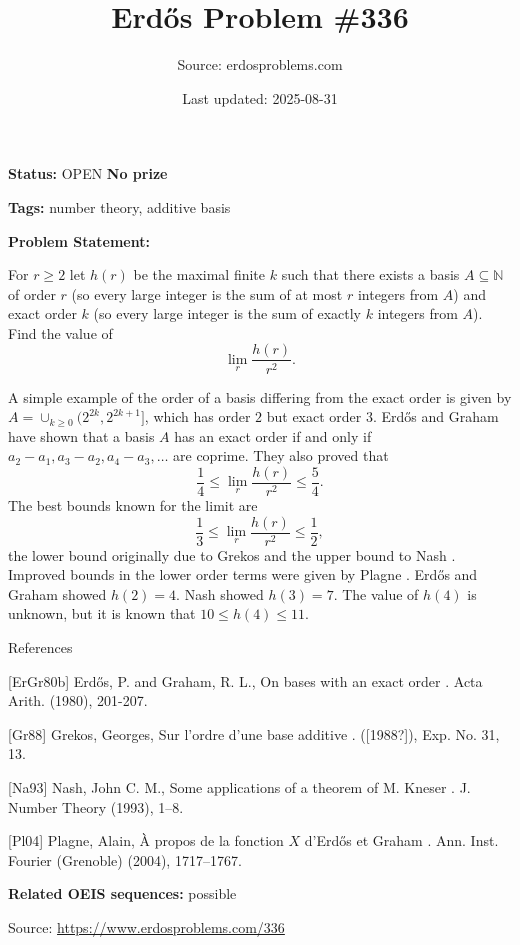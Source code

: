 \documentclass{article}
\title{Erd\H{o}s Problem \#336}
\date{Last updated: 2025-08-31}
\author{Source: erdosproblems.com}
\begin{document}
\maketitle

\noindent\textbf{Status:} OPEN \quad \textbf{No prize}

\noindent\textbf{Tags:} number theory, additive basis

\medskip

\noindent\textbf{Problem Statement:}

For $r\geq 2$ let $h(r)$ be the maximal finite $k$ such that there exists a basis $A\subseteq \mathbb{N}$ of order $r$ (so every large integer is the sum of at most $r$ integers from $A$) and exact order $k$ (so every large integer is the sum of exactly $k$ integers from $A$). Find the value of\[\lim_r \frac{h(r)}{r^2}.\]




A simple example of the order of a basis differing from the exact order is given by $A=\cup_{k\geq 0}(2^{2k},2^{2k+1}]$, which has order $2$ but exact order $3$. Erd\H{o}s and Graham \cite{ErGr80b} have shown that a basis $A$ has an exact order if and only if $a_2-a_1,a_3-a_2,a_4-a_3,\ldots$ are coprime. They also proved that\[\frac{1}{4}\leq \lim_r \frac{h(r)}{r^2}\leq \frac{5}{4}.\]The best bounds known for the limit are\[\frac{1}{3}\leq \lim_r \frac{h(r)}{r^2}\leq \frac{1}{2},\]the lower bound originally due to Grekos \cite{Gr88} and the upper bound to Nash \cite{Na93}. Improved bounds in the lower order terms were given by Plagne \cite{Pl04}. Erd\H{o}s and Graham \cite{ErGr80b} showed $h(2)=4$. Nash \cite{Na93} showed $h(3)=7$. The value of $h(4)$ is unknown, but it is known \cite{Pl04} that $10\leq h(4)\leq 11$.




References

[ErGr80b] Erd\H{o}s, P. and Graham, R. L., On bases with an exact order . Acta Arith. (1980), 201-207.

[Gr88] Grekos, Georges, Sur l'ordre d'une base additive . ([1988?]), Exp. No. 31, 13.

[Na93] Nash, John C. M., Some applications of a theorem of {M}. {K}neser . J. Number Theory (1993), 1--8.

[Pl04] Plagne, Alain, \`A{} propos de la fonction {$X$} d'{E}rd\H{o}s et {G}raham . Ann. Inst. Fourier (Grenoble) (2004), 1717--1767.

\noindent\textbf{Related OEIS sequences:} possible


\bigskip
\noindent\small{Source: \url{https://www.erdosproblems.com/336}}
\end{document}
